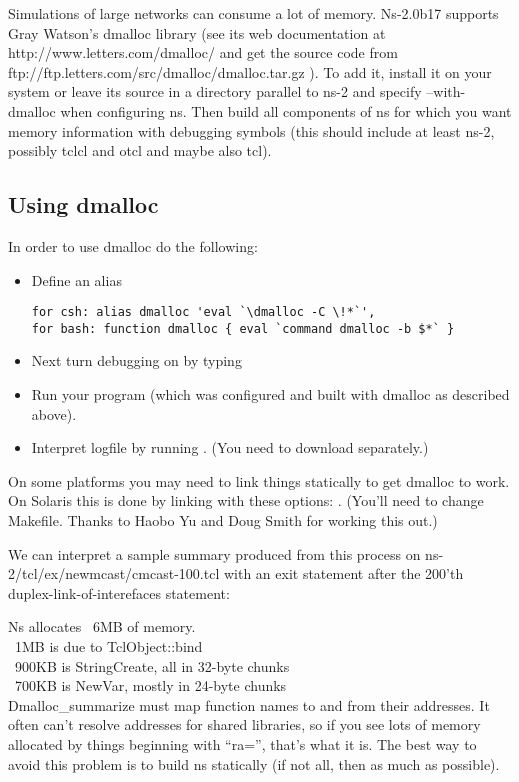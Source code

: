 Simulations of large networks can consume a lot of memory. Ns-2.0b17
supports Gray Watson's dmalloc library (see its web documentation at
http://www.letters.com/dmalloc/ and get the source code from
ftp://ftp.letters.com/src/dmalloc/dmalloc.tar.gz ).
To add it, install it on your system or leave its source in
a directory parallel to ns-2 and specify --with-dmalloc when configuring
ns. Then build all components of ns for which you want memory information
with debugging symbols (this should include at least ns-2, possibly tclcl
and otcl and maybe also tcl). 


\subsection{Using dmalloc}
\label{sec:usedmalloc}

In order to use dmalloc do the following:
\begin{itemize}
\item Define an alias 
\begin{verbatim}
for csh: alias dmalloc 'eval `\dmalloc -C \!*`', 
for bash: function dmalloc { eval `command dmalloc -b $*` }
\end{verbatim}
\item Next turn debugging on by typing 
\item Run your program (which was configured and built with dmalloc as
described above). 
\item Interpret logfile by running .
(You need to download  separately.) 
\end{itemize}

On some platforms you may need to link things statically to get dmalloc to
work. On Solaris this is done by linking with these options:
.
(You'll need to change Makefile. Thanks to
Haobo Yu and Doug Smith for working this out.) 

We can interpret a sample summary produced from this process on
ns-2/tcl/ex/newmcast/cmcast-100.tcl with an exit statement after the
200'th duplex-link-of-interefaces statement: 

Ns allocates ~6MB of memory. \\
~1MB is due to TclObject::bind \\
~900KB is StringCreate, all in 32-byte chunks \\
~700KB is NewVar, mostly in 24-byte chunks \\
Dmalloc\_summarize must map function names to and from their addresses. It
often can't resolve addresses for shared libraries, so if you see lots of
memory allocated by things beginning with ``ra='', that's what it is. The
best way to avoid this problem is to build ns statically (if not all, then
as much as possible). 

